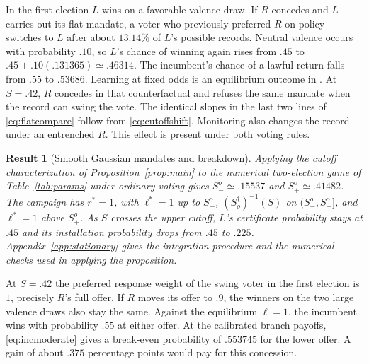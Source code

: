 \documentclass[11pt,letterpaper]{article}
\newtheorem{result}{Result}
\begin{document}
In the first election $L$ wins on a favorable valence draw. If $R$ concedes and $L$ carries out its flat mandate, a voter who previously preferred $R$ on policy switches to $L$ after about $13.14\%$ of $L$'s possible records. Neutral valence occurs with probability $.10$, so $L$'s chance of winning again rises from $.45$ to $.45+.10(.131365)\simeq .46314$. The incumbent's chance of a lawful return falls from $.55$ to $.53686$. Learning at fixed odds is an equilibrium outcome in \citet{kartikst}. At $S=.42$, $R$ concedes in that counterfactual and refuses the same mandate when the record can swing the vote. The identical slopes in the last two lines of \eqref{eq:flatcompare} follow from \eqref{eq:cutoffshift}. Monitoring also changes the record under an entrenched $R$. This effect is present under both voting rules.

\begin{result}[Smooth Gaussian mandates and breakdown]\label{prop:two}
Applying the cutoff characterization of Proposition~\ref{prop:main} to the numerical two-election game of Table~\ref{tab:params} under ordinary voting gives $S_-^o\simeq .15537$ and $S_+^o\simeq .41482$. The campaign has $r^*=1$, with $\ell^*=1$ up to $S_-^o$, $(S_o^\dagger)^{-1}(S)$ on $(S_-^o,S_+^o]$, and $\ell^*=1$ above $S_+^o$. As $S$ crosses the upper cutoff, $L$'s certificate probability stays at $.45$ and its installation probability drops from $.45$ to $.225$. Appendix~\ref{app:stationary} gives the integration procedure and the numerical checks used in applying the proposition.
\end{result}

At $S=.42$ the preferred response weight of the swing voter in the first election is $1$, precisely $R$'s full offer. If $R$ moves its offer to $.9$, the winners on the two large valence draws also stay the same. Against the equilibrium $\ell=1$, the incumbent wins with probability $.55$ at either offer. At the calibrated branch payoffs, \eqref{eq:incmoderate} gives a break-even probability of $.553745$ for the lower offer. A gain of about $.375$ percentage points would pay for this concession.
\end{document}
